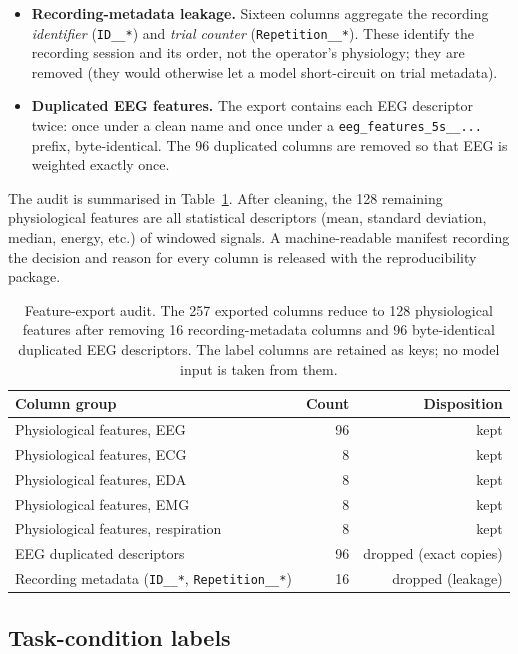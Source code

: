 \documentclass{llncs}
\begin{document}
\begin{itemize}
\item \textbf{Recording-metadata leakage.} Sixteen columns aggregate the recording
\emph{identifier} (\texttt{ID\_\_*}) and \emph{trial counter} (\texttt{Repetition\_\_*}).
These identify the recording session and its order, not the operator's physiology;
they are removed (they would otherwise let a model short-circuit on trial metadata).
\item \textbf{Duplicated \ac{EEG} features.} The export contains each \ac{EEG}
descriptor twice: once under a clean name and once under a
\texttt{eeg\_features\_5s\_\_...} prefix, byte-identical. The 96 duplicated columns
are removed so that \ac{EEG} is weighted exactly once. %
\end{itemize}

The audit is summarised in Table~\ref{tab:audit}. After cleaning, the 128 remaining
physiological features are all statistical descriptors (mean, standard deviation,
median, energy, etc.) of windowed signals. A machine-readable manifest recording the
decision and reason for every column is released with the reproducibility package.

\begin{table}[t]
\centering
\small
\caption{Feature-export audit. The 257 exported columns reduce to 128 physiological
features after removing 16 recording-metadata columns and 96 byte-identical duplicated
\ac{EEG} descriptors. The label columns are retained as keys; no model input is taken
from them.}
\label{tab:audit}
\begin{tabular}{lrr}
\toprule
Column group & Count & Disposition \\
\midrule
Physiological features, \ac{EEG} & 96 & kept \\
Physiological features, \ac{ECG} & 8 & kept \\
Physiological features, \ac{EDA} & 8 & kept \\
Physiological features, \ac{EMG} & 8 & kept \\
Physiological features, respiration & 8 & kept \\
\hline
\ac{EEG} duplicated descriptors & 96 & dropped (exact copies) \\
Recording metadata (\texttt{ID\_\_*}, \texttt{Repetition\_\_*}) & 16 & dropped (leakage) \\
\bottomrule
\end{tabular}
\end{table}

\subsection{Task-condition labels}
\end{document}

